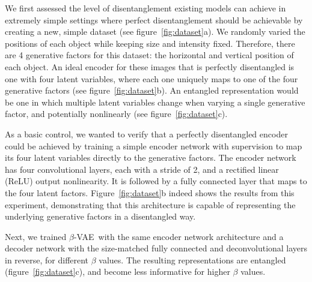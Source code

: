 \documentclass[10pt,letterpaper]{article}
\newcommand{\bvae}{$\beta$-VAE~}
\begin{document}
We first assessed the level of disentanglement existing models can achieve in extremely simple settings where perfect disentanglement should be achievable by creating a new, simple dataset (see figure~\ref{fig:dataset}a). We randomly varied the positions of each object while keeping size and intensity fixed. Therefore, there are 4 generative factors for this dataset: the horizontal and vertical position of each object. An ideal encoder for these images that is perfectly disentangled is one with four latent variables, where each one uniquely maps to one of the four generative factors (see figure~\ref{fig:dataset}b). An entangled representation would be one in which multiple latent variables change when varying a single generative factor, and potentially nonlinearly (see figure~\ref{fig:dataset}c).

As a basic control, we wanted to verify that a perfectly disentangled encoder could be achieved by training a simple encoder network with supervision to map its four latent variables directly to the generative factors. The encoder network has four convolutional layers, each with a stride of 2, and a rectified linear (ReLU) output nonlinearity. It is followed by a fully connected layer that maps to the four latent factors. Figure~\ref{fig:dataset}b indeed shows the results from this experiment, demonstrating that this architecture is capable of representing the underlying generative factors in a disentangled way.

Next, we trained \bvae with the same encoder network architecture and a decoder network with the size-matched fully connected and deconvolutional layers in reverse, for different $\beta$ values. The resulting representations are entangled (figure~\ref{fig:dataset}c), and become less informative for higher $\beta$ values.

\end{document}
